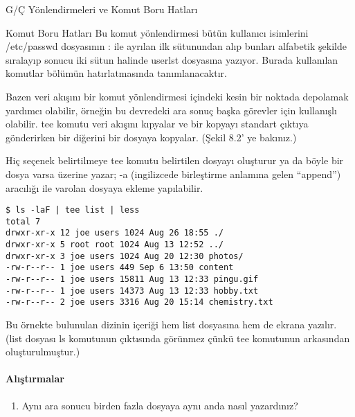 \begin{section}{G/Ç Yönlendirmeleri ve Komut Boru Hatları}
\begin{subsection}{Komut Boru Hatları}
Bu komut yönlendirmesi bütün kullanıcı isimlerini /etc/passwd dosyasının : ile ayrılan ilk sütunundan alıp bunları alfabetik şekilde sıralayıp sonucu iki sütun halinde userlst dosyasına yazıyor. Burada kullanılan komutlar bölümün hatırlatmasında tanımlanacaktır.

Bazen veri akışını bir komut yönlendirmesi içindeki kesin bir noktada depolamak yardımcı olabilir, örneğin bu devredeki ara sonuç başka görevler için kullanışlı olabilir. tee komutu veri akışını kıpyalar ve bir kopyayı standart çıktıya gönderirken bir diğerini bir dosyaya kopyalar. (Şekil 8.2' ye bakınız.)

Hiç seçenek belirtilmeye tee komutu belirtilen dosyayı oluşturur ya da böyle bir dosya varsa üzerine yazar; -a (ingilizcede birleştirme anlamına gelen “append”) aracılığı ile varolan dosyaya ekleme yapılabilir.
\begin{verbatim}
$ ls -laF | tee list | less
total 7
drwxr-xr-x 12 joe users 1024 Aug 26 18:55 ./
drwxr-xr-x 5 root root 1024 Aug 13 12:52 ../
drwxr-xr-x 3 joe users 1024 Aug 20 12:30 photos/
-rw-r--r-- 1 joe users 449 Sep 6 13:50 content
-rw-r--r-- 1 joe users 15811 Aug 13 12:33 pingu.gif
-rw-r--r-- 1 joe users 14373 Aug 13 12:33 hobby.txt
-rw-r--r-- 2 joe users 3316 Aug 20 15:14 chemistry.txt
\end{verbatim}

Bu örnekte bulunulan dizinin içeriği hem list dosyasına hem de ekrana yazılır. (list dosyası ls komutunun çıktısında görünmez çünkü tee komutunun arkasından oluşturulmuştur.)

\paragraph{{\Huge{\PencilLeftDown}}Alıştırmalar}{
\begin{enumerate}
 \item Aynı ara sonucu birden fazla dosyaya aynı anda nasıl yazardınız?
\end{enumerate}}
\end{subsection}
\end{section}
